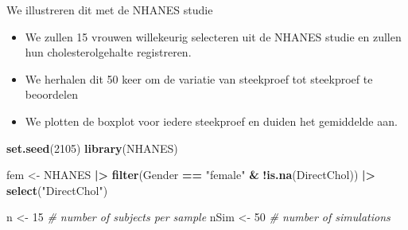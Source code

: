 \documentclass[
  12pt,dutch]{book}
\newenvironment{Shaded}{\begin{snugshade}}{\end{snugshade}}
\newcommand{\CommentTok}[1]{\textcolor[rgb]{0.56,0.35,0.01}{\textit{#1}}}
\newcommand{\DecValTok}[1]{\textcolor[rgb]{0.00,0.00,0.81}{#1}}
\newcommand{\FunctionTok}[1]{\textcolor[rgb]{0.13,0.29,0.53}{\textbf{#1}}}
\newcommand{\NormalTok}[1]{#1}
\newcommand{\OtherTok}[1]{\textcolor[rgb]{0.56,0.35,0.01}{#1}}
\newcommand{\SpecialCharTok}[1]{\textcolor[rgb]{0.81,0.36,0.00}{\textbf{#1}}}
\newcommand{\StringTok}[1]{\textcolor[rgb]{0.31,0.60,0.02}{#1}}
\providecommand{\tightlist}{%
  \setlength{\itemsep}{0pt}\setlength{\parskip}{0pt}}
\theoremstyle{definition}
\theoremstyle{definition}
\theoremstyle{definition}
\theoremstyle{definition}
\theoremstyle{remark}
\begin{document}
We illustreren dit met de NHANES studie

\begin{itemize}
\tightlist
\item
  We zullen 15 vrouwen willekeurig selecteren uit de NHANES studie en zullen hun cholesterolgehalte registreren.
\item
  We herhalen dit 50 keer om de variatie van steekproef tot steekproef te beoordelen
\item
  We plotten de boxplot voor iedere steekproef en duiden het gemiddelde aan.
\end{itemize}

\begin{Shaded}
\begin{Highlighting}[]
\FunctionTok{set.seed}\NormalTok{(}\DecValTok{2105}\NormalTok{)}
\FunctionTok{library}\NormalTok{(NHANES)}

\NormalTok{fem }\OtherTok{\textless{}{-}}\NormalTok{ NHANES }\SpecialCharTok{|\textgreater{}}
    \FunctionTok{filter}\NormalTok{(Gender }\SpecialCharTok{==} \StringTok{"female"} \SpecialCharTok{\&} \SpecialCharTok{!}\FunctionTok{is.na}\NormalTok{(DirectChol)) }\SpecialCharTok{|\textgreater{}}
    \FunctionTok{select}\NormalTok{(}\StringTok{"DirectChol"}\NormalTok{)}

\NormalTok{n }\OtherTok{\textless{}{-}} \DecValTok{15}  \CommentTok{\# number of subjects per sample}
\NormalTok{nSim }\OtherTok{\textless{}{-}} \DecValTok{50}  \CommentTok{\# number of simulations}


\end{Highlighting}
\end{Shaded}
\end{document}
